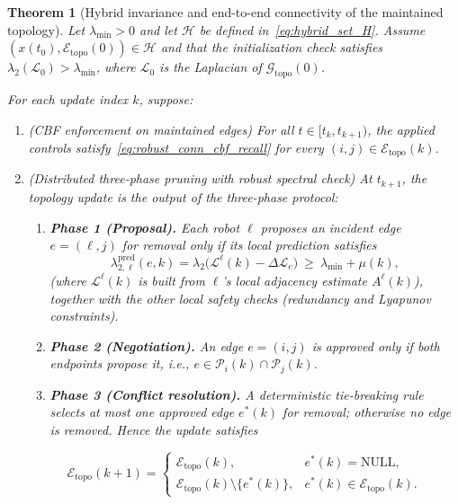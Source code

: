 \documentclass[conference]{IEEEconf}
\theoremstyle{plain}
\newtheorem{theorem}{Theorem} %
\begin{document}
\begin{theorem}[Hybrid invariance and end-to-end connectivity of the maintained topology]
\label{thm:global_connectivity}
Let $\lambda_{\min}>0$ and let $\mathcal{H}$ be defined in~\eqref{eq:hybrid_set_H}.
Assume $(x(t_0),\mathcal{E}_{\mathrm{topo}}(0))\in\mathcal{H}$ and that the initialization check satisfies
$\lambda_2(\mathcal{L}_0)>\lambda_{\min}$, where $\mathcal{L}_0$ is the Laplacian of $\mathcal{G}_{\mathrm{topo}}(0)$.

For each update index $k$, suppose:

\begin{enumerate}
\item (\emph{CBF enforcement on maintained edges})
For all $t\in[t_k,t_{k+1})$, the applied controls satisfy~\eqref{eq:robust_conn_cbf_recall} for every
$(i,j)\in\mathcal{E}_{\mathrm{topo}}(k)$.

\item (\emph{Distributed three-phase pruning with robust spectral check})
At $t_{k+1}$, the topology update is the output of the three-phase protocol:
\begin{enumerate}
\item \textbf{Phase 1 (Proposal).} Each robot $\ell$ proposes an incident edge $e=(\ell,j)$ for removal only if its \emph{local}
prediction satisfies
\begin{equation}
\lambda_{2,\ell}^{\mathrm{pred}}(e,k)
=
\lambda_2\!\big(\mathcal{L}^{\ell}(k)-\Delta\mathcal{L}_e\big)
\ \ge\ \lambda_{\min}+\mu(k),
\label{eq:phase1_conn_check}
\end{equation}
(where $\mathcal{L}^{\ell}(k)$ is built from $\ell$'s local adjacency estimate $A^{\ell}(k)$),
together with the other local safety checks (redundancy and Lyapunov constraints).

\item \textbf{Phase 2 (Negotiation).} An edge $e=(i,j)$ is \emph{approved} only if both endpoints propose it, i.e.,
$e\in\mathcal{P}_i(k)\cap\mathcal{P}_j(k)$.

\item \textbf{Phase 3 (Conflict resolution).} A deterministic tie-breaking rule selects at most one approved edge
$e^*(k)$ for removal; otherwise no edge is removed. Hence the update satisfies
\end{enumerate}

\begin{equation}
\mathcal{E}_{\mathrm{topo}}(k{+}1)
=
\begin{cases}
\mathcal{E}_{\mathrm{topo}}(k), & e^*(k)=\mathrm{NULL},\\
\mathcal{E}_{\mathrm{topo}}(k)\setminus\{e^*(k)\}, & e^*(k)\in\mathcal{E}_{\mathrm{topo}}(k).
\end{cases}
\label{eq:topo_update_cases}
\end{equation}


\end{enumerate}
\end{theorem}
\end{document}
